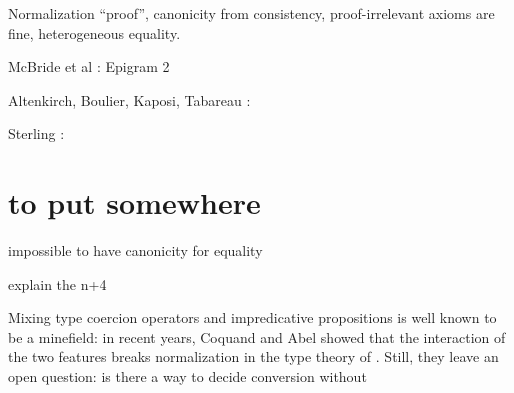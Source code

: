 Normalization ``proof'', canonicity from consistency, proof-irrelevant axioms 
are fine, heterogeneous equality.

McBride et al : Epigram 2

Altenkirch, Boulier, Kaposi, Tabareau :

Sterling :

\section{to put somewhere}

impossible to have canonicity for equality

explain the n+4


Mixing type coercion operators and impredicative propositions is well known to 
be a minefield:
in recent years, Coquand and Abel showed that the interaction of the two features 
breaks normalization in the type theory of \Lean {}.
% 
Still, they leave an open question: is there a way to decide conversion without

 
